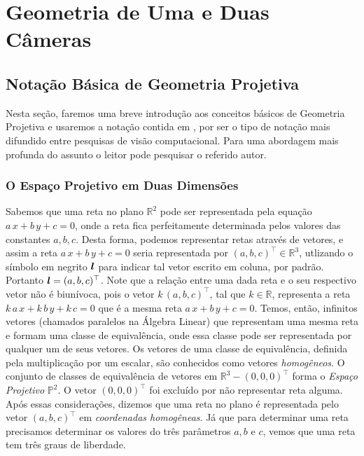 \section{Geometria de Uma e Duas Câmeras}

\subsection{Notação Básica de Geometria Projetiva}

Nesta seção, faremos uma breve introdução aos conceitos básicos de Geometria Projetiva e usaremos a notação contida em \cite{Hartley2004}, por ser o tipo de notação mais difundido entre pesquisas de visão computacional. Para uma abordagem mais profunda do assunto o leitor pode pesquisar o referido autor.  

\subsubsection{O Espaço Projetivo em Duas Dimensões}





Sabemos que uma reta no plano $\mathbb{R}^{2}$ pode ser representada pela equação $a\,x+b\,y+c=0$, onde a reta fica perfeitamente determinada pelos valores das constantes $a,b,c$. Desta forma, podemos representar retas através de vetores, e assim a reta $a\,x+b\,y+c=0$ seria representada por $(a,b,c)^\top \in \mathbb{R}^{3}$, utlizando o símbolo em negrito $\boldsymbol{l}$ para indicar tal vetor escrito em coluna, por padrão. Portanto $\boldsymbol{l} = (a,b,c)^\top$. Note que a relação entre uma dada reta e o seu respectivo vetor não é biunívoca, pois o vetor $k\,(a,b,c)^\top$, tal que $k \in \mathbb{R}$, representa a reta $k\,a\,x+k\,b\,y+k\,c=0$ que é a mesma reta $a\,x+b\,y+c=0$. Temos, então, infinitos vetores (chamados paralelos na Álgebra Linear) que representam uma mesma reta e formam uma classe de equivalência, onde essa classe pode ser representada por qualquer um de seus vetores. Os vetores de uma classe de equivalência, definida pela multiplicação por um escalar, são conhecidos como vetores {\it homogêneos}. O conjunto de classes de equivalência de vetores em $\mathbb{R}^{3} - (0,0,0)^\top$ forma o {\it Espaço Projetivo} $\mathbb{P}^{2}$. O vetor $(0,0,0)^\top$ foi excluído por não representar reta alguma. Após essas considerações, dizemos que uma reta no plano é representada pelo vetor $(a,b,c)^\top$ em {\it coordenadas homogêneas}. Já que para determinar uma reta precisamos determinar os valores do três parâmetros $a,b \,\,\text{e}\,\, c$, vemos que uma reta tem três graus de liberdade.\\

